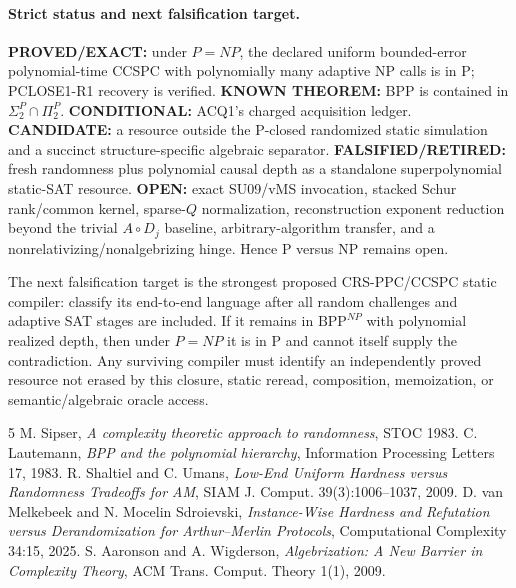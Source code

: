 \documentclass[11pt]{article}
\begin{document}
\paragraph{Strict status and next falsification target.}
\textbf{PROVED/EXACT:} under \(P=NP\), the declared uniform bounded-error polynomial-time CCSPC with
polynomially many adaptive NP calls is in P; PCLOSE1-R1 recovery is verified.
\textbf{KNOWN THEOREM:} BPP is contained in \(\Sigma_2^P\cap\Pi_2^P\).
\textbf{CONDITIONAL:} ACQ1's charged acquisition ledger.
\textbf{CANDIDATE:} a resource outside the P-closed randomized static simulation and a succinct
structure-specific algebraic separator.
\textbf{FALSIFIED/RETIRED:} fresh randomness plus polynomial causal depth as a standalone
superpolynomial static-SAT resource.
\textbf{OPEN:} exact SU09/vMS invocation, stacked Schur rank/common kernel, sparse-\(Q\) normalization,
reconstruction exponent reduction beyond the trivial \(A\circ D_j\) baseline, arbitrary-algorithm
transfer, and a nonrelativizing/nonalgebrizing hinge. Hence P versus NP remains open.

The next falsification target is the strongest proposed CRS-PPC/CCSPC static compiler: classify its
end-to-end language after all random challenges and adaptive SAT stages are included. If it remains in
\(\mathrm{BPP}^{NP}\) with polynomial realized depth, then under \(P=NP\) it is in P and cannot itself
supply the contradiction. Any surviving compiler must identify an independently proved resource not
erased by this closure, static reread, composition, memoization, or semantic/algebraic oracle access.

\begin{thebibliography}{5}
 M. Sipser, \emph{A complexity theoretic approach to randomness}, STOC 1983.
 C. Lautemann, \emph{BPP and the polynomial hierarchy}, Information Processing Letters 17, 1983.
 R. Shaltiel and C. Umans, \emph{Low-End Uniform Hardness versus Randomness Tradeoffs for AM}, SIAM J. Comput. 39(3):1006--1037, 2009.
 D. van Melkebeek and N. Mocelin Sdroievski, \emph{Instance-Wise Hardness and Refutation versus Derandomization for Arthur--Merlin Protocols}, Computational Complexity 34:15, 2025.
 S. Aaronson and A. Wigderson, \emph{Algebrization: A New Barrier in Complexity Theory}, ACM Trans. Comput. Theory 1(1), 2009.
\end{thebibliography}
\end{document}
